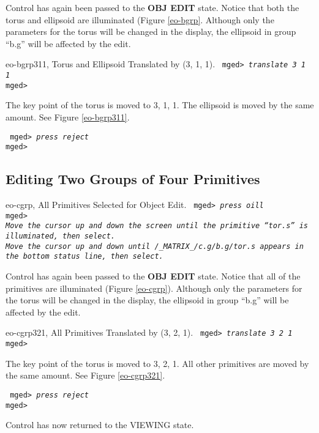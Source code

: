 Control has again been passed to the {\bf OBJ EDIT} state. Notice that
both the torus and ellipsoid are illuminated (Figure \ref{eo-bgrp}.
Although only the parameters for the torus will be changed in the
display, the ellipsoid in group ``b.g'' will be affected by the edit.

\mfig eo-bgrp311, Torus and Ellipsoid Translated by (3, 1, 1).
\noindent
{\tt
mged> {\em translate 3 1 1}\\
mged>\\
}

The key point of the torus is moved to 3, 1, 1. The ellipsoid is
moved by the same amount.  See Figure \ref{eo-bgrp311}.

\noindent
{\tt
mged> {\em press reject}\\
mged>\\
}

\subsection{Editing Two Groups of Four Primitives}

\mfig eo-cgrp, All Primitives Selected for Object Edit.
\noindent
{\tt
mged> {\em press oill}\\
mged>\\
{\em Move the cursor up and down the screen until the primitive ``tor.s''
is illuminated, then select.}\\
{\em Move the cursor up and down until {\tt /\_MATRIX\_/c.g/b.g/tor.s} appears
in the bottom status line, then select.}\\
}

Control has again been passed to the {\bf OBJ EDIT} state. Notice that
all of the primitives are illuminated (Figure \ref{eo-cgrp}).
Although only the parameters for the torus will be changed in the
display, the ellipsoid in group ``b.g'' will be affected by the edit.

\mfig eo-cgrp321, All Primitives Translated by (3, 2, 1).
\noindent
{\tt
mged> {\em translate 3 2 1}\\
mged>\\
}

The key point of the torus is moved to 3, 2, 1. All other primitives are
moved by the same amount.  See Figure \ref{eo-cgrp321}.

\noindent
{\tt
mged> {\em press reject}\\
mged>\\
}

Control has now returned to the VIEWING state.
